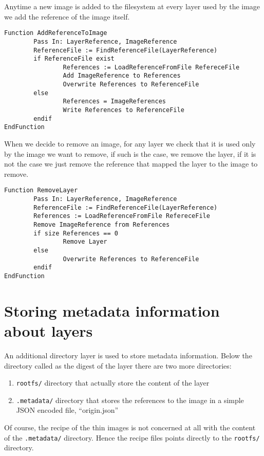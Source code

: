 Anytime a new image is added to the filesystem at every layer used by the image we add the reference of the image itself.

\begin{lstlisting}[caption={Algorithm to add an image reference to the layer metadata}, label={lst:add-image-reference-to-layer}]
Function AddReferenceToImage
        Pass In: LayerReference, ImageReference
        ReferenceFile := FindReferenceFile(LayerReference)
        if ReferenceFile exist
                References := LoadReferenceFromFile RefereceFile
                Add ImageReference to References
                Overwrite References to ReferenceFile
        else 
                References = ImageReferences
                Write References to ReferenceFile
        endif
EndFunction
\end{lstlisting}

When we decide to remove an image, for any layer we check that it is used only by the image we want to remove, if such is the case, we remove the layer, if it is not the case we just remove the reference that mapped the layer to the image to remove.

\begin{lstlisting}[caption={Algorithm to remove an image from the filesystem}, label={lst:remove-layer}]
Function RemoveLayer
        Pass In: LayerReference, ImageReference
        ReferenceFile := FindReferenceFile(LayerReference)
        References := LoadReferenceFromFile RefereceFile
        Remove ImageReference from References
        if size References == 0
                Remove Layer
        else
                Overwrite References to ReferenceFile
        endif
EndFunction
\end{lstlisting}


\section{Storing metadata information about layers}

An additional directory layer is used to store metadata information. 
Below the directory called as the digest of the layer there are two more directories: 
\begin{enumerate} 
        \item \texttt{rootfs/} directory that actually store the content of the layer
        \item \texttt{.metadata/} directory that stores the references to the image in a simple JSON encoded file, “origin.json” 
\end{enumerate}

Of course, the recipe of the thin images is not concerned at all with the content of the \texttt{.metadata/} directory. Hence the recipe files points directly to the \texttt{rootfs/} directory.
